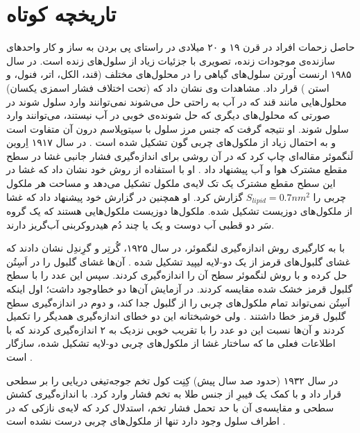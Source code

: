 \section{
تاریخچه کوتاه
}
حاصل زحمات افراد در قرن ۱۹ و ۲۰ میلادی در راستای پی بردن به ساز و کار واحد‌های سازنده‌ی موجودات زنده، تصویری با جزئیات زیاد از سلول‌های زنده است. در سال ۱۹۸۵ ارنست اُورتن 
سلول‌های گیاهی را در محلول‌های مختلف (قند،‌ الکل، اتر، فنول، و استن
) قرار داد. مشاهدات وی نشان داد که (تحت اختلاف فشار اسمزی یکسان) محلول‌هایی مانند قند که در آب به راحتی حل می‌شوند نمی‌توانند وارد سلول شوند در صورتی که محلول‌های دیگری که حل شونده‌ی خوبی در آب نیستند، می‌توانند وارد سلول شوند. او نتیجه گرفت که جنس مرز سلول با سیتوپلاسم درون آن متفاوت است و به احتمال زیاد از ملکول‌های چربی گون تشکیل شده است
\cite{overton1985}.
در سال ۱۹۱۷ اِروین لَنگموئر
 مقاله‌ای چاپ کرد که در آن روشی برای اندازه‌گیری فشار جانبی
 غشا در سطح مقطع مشترک هوا و آب پیشنهاد داد
 \cite{Langmuir1917}.
 او با استفاده از روش خود نشان داد که غشا در این سطح مقطع مشترک یک تک لایه‌ی ملکول تشکیل می‌دهد و مساحت هر ملکول چربی را 
 $S_{lipid} = 0.7 nm^2$
 گزارش کرد. او همچنین در گزارش خود پیشنهاد داد که غشا از ملکول‌های دوزیست
 تشکیل شده. ملکول‌ها دوزیست ملکول‌هایی هستند که یک گروه سَر دو قطبی آب دوست و یک یا چند دُم هیدروکربنی آب‌گریز دارند.
 
 با به کارگیری روش اندازه‌گیری لنگموئر، در سال ۱۹۲۵، گُرتِر
 و گرِندِل
 نشان دادند که  غشای گلبول‌های قرمز از یک دو-لایه لیپید تشکیل شده
 \cite{Gorter1925}.
 آن‌ها غشای گلبول را در اَسِتُن حل کرده و با روش لنگموئر سطح آن را اندازه‌گیری کردند. سپس این عدد را با سطح گلبول قرمز خشک شده مقایسه کردند. در آزمایش آن‌ها دو خطاوجود داشت؛ اول اینکه اَسِتُن نمی‌تواند تمام ملکول‌های چربی را از گلبول جدا کند، و دوم در اندازه‌گیری سطح گلبول قرمز خطا داشتند
 \cite{BiomembranesBook1989,BioMemBook2007}.
 ولی خوشبختانه این دو خطای اندازه‌گیری همدیگر را تکمیل کردند و آن‌ها نسبت این دو عدد را با تقریب خوبی نزدیک به ۲ اندازه‌گیری کردند که با اطلاعات فعلی ما که ساختار غشا از ملکول‌های چربی دو-لایه تشکیل شده، سازگار است
 \cite{Edidin2003}.
 
  
 
 
 در سال ۱۹۳۲ (حدود صد سال پیش) کِنِت کول
 تخم جوجه‌تیغی دریایی
را بر سطحی قرار داد و  با کمک یک فیبرِ از جنس طلا به تخم  فشار وارد کرد. با اندازه‌گیری  کشش سطحی و مقایسه‌ی آن با حد تحمل فشار تخم، استدلال کرد که لایه‌ی نازکی که در اطراف سلول وجود دارد تنها از ملکول‌های چربی درست نشده است
 \cite{Cole1932}. 

